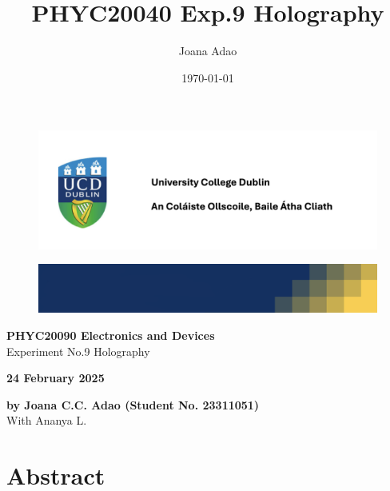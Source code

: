 \documentclass[12pt]{article}
\title{PHYC20040 Exp.9 Holography}
\author{Joana Adao}
\date{\today}
\begin{document}
\begin{titlepage}
    \begin{center}

        \begin{figure}[ht]
            \includegraphics[width=\textwidth]{UCDLogo.png}
        \end{figure}
        
        \begin{figure}
            \centerline{\includegraphics[width=\paperwidth]{UCDBanner.png}}
        \end{figure}

        \vspace{4cm}

        {\LARGE \bfseries PHYC20090 Electronics and Devices}\\
        \vspace{0.75cm}
        {\Large Experiment No.9 Holography}
        
        \vspace{1cm}
    
    {\Large \textbf{24 February 2025}}

    \vspace{2cm}
    
    {\large \textbf{by Joana C.C. Adao (Student No. 23311051)}}\\
    \medskip
    {\large With Ananya L.}

    \end{center}
    
   \clearpage

\end{titlepage}


\tableofcontents
\thispagestyle{empty}

\newpage

\section*{Abstract}
\thispagestyle{empty}
\end{document}
